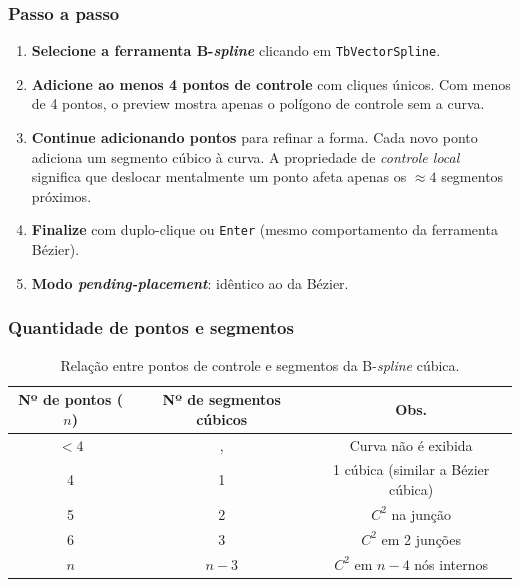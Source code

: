 \documentclass[12pt, a4paper]{article}
\theoremstyle{remark}
\begin{document}
\subsubsection*{Passo a passo}

\begin{enumerate}[leftmargin=1.6cm, label=\textbf{Passo \arabic*.}]

    \item \textbf{Selecione a ferramenta B-\emph{spline}} clicando em
          \texttt{TbVectorSpline}.

    \item \textbf{Adicione ao menos 4 pontos de controle} com cliques únicos.
          Com menos de 4 pontos, o preview mostra apenas o polígono de controle
          sem a curva.

    \item \textbf{Continue adicionando pontos} para refinar a forma. Cada novo
          ponto adiciona um segmento cúbico à curva. A propriedade de
          \emph{controle local} significa que deslocar mentalmente um ponto
          afeta apenas os $\approx 4$ segmentos próximos.

    \item \textbf{Finalize} com duplo-clique ou \texttt{Enter} (mesmo
          comportamento da ferramenta Bézier).

    \item \textbf{Modo \emph{pending-placement}}: idêntico ao da Bézier.

\end{enumerate}

\subsubsection*{Quantidade de pontos e segmentos}

\begin{table}[H]
\centering
\begin{tabular}{ccc}
\toprule
\textbf{Nº de pontos ($n$)} & \textbf{Nº de segmentos cúbicos} & \textbf{Obs.} \\
\midrule
$< 4$ &, & Curva não é exibida \\
4 & 1 & 1 cúbica (similar a Bézier cúbica) \\
5 & 2 & $C^2$ na junção \\
6 & 3 & $C^2$ em 2 junções \\
$n$ & $n - 3$ & $C^2$ em $n-4$ nós internos \\
\bottomrule
\end{tabular}
\caption{Relação entre pontos de controle e segmentos da B-\emph{spline} cúbica.}
\end{table}
\end{document}
